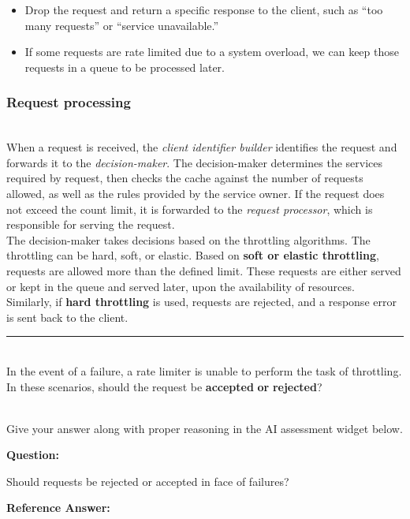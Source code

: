 \begin{itemize}
\item
\protect{}\label{ZalF_f3XOX5G6fnxP1a8j}
Drop the request and return a specific response to the client, such as ``too many requests'' or ``service unavailable.''
\item
\protect{}\label{Ly4dwUxsRWLh0zkRPqehP}
If some requests are rate limited due to a system overload, we can keep those requests in a queue to be processed later.
\end{itemize}

\subsubsection{Request processing}\label{Q6MwqZQbCka7E0UBXLic7}
\\
When a request is received, the \emph{client identifier builder} identifies the request and forwards it to the \emph{decision-maker}. The decision-maker determines the services required by request, then checks the cache against the number of requests allowed, as well as the rules provided by the service owner. If the request does not exceed the count limit, it is forwarded to the \emph{request processor}, which is responsible for serving the request.
\\
The decision-maker takes decisions based on the throttling algorithms. The throttling can be hard, soft, or elastic. Based on \textbf{soft or elastic throttling}, requests are allowed more than the defined limit. These requests are either served or kept in the queue and served later, upon the availability of resources. Similarly, if \textbf{hard throttling} is used, requests are rejected, and a response error is sent back to the client.

\begin{center}\rule{0.5\linewidth}{0.5pt}\end{center}
\\
In the event of a failure, a rate limiter is unable to perform the task of throttling. In these scenarios, should the request be \textbf{accepted} \textbf{or} \textbf{rejected}?\\
\strut \\
Give your answer along with proper reasoning in the AI assessment widget below.

\textbf{Question:}

Should requests be rejected or accepted in face of failures?

\textbf{Reference Answer:}

